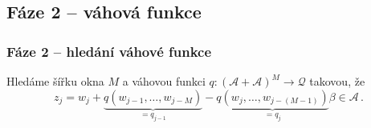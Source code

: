\documentclass[11pt]{beamer}
\newcommand{\A}{\mathcal{A}}
\newcommand{\Q}{\mathcal{Q}}
\begin{document}
\subsection{Fáze 2 -- váhová funkce}
\begin{frame}
    \frametitle{Fáze 2 -- hledání váhové funkce}

    Hledáme šířku okna $M$ a váhovou funkci $q:(\A+\A)^{M} \to \Q$ takovou, že
    $$
    z_j=w_j + \underbrace{q(w_{j-1}, \dots, w_{j-M})}_{=q_{j-1}} - \underbrace{q(w_j, \dots, w_{j-(M-1)})}_{=q_{j}} \beta \in \A \,.
    $$
    
%    
%        
\end{frame}    




\end{document}
